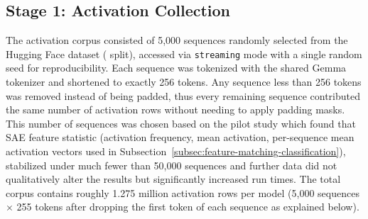 \subsection{Stage 1: Activation Collection}
\label{subsec:activation-collection}

The activation corpus consisted of 5,000 sequences randomly selected from the Hugging Face  dataset ( split), accessed via \texttt{streaming} mode with a single random seed for reproducibility. Each sequence was tokenized with the shared Gemma tokenizer and shortened to exactly 256 tokens. Any sequence less than 256 tokens was removed instead of being padded, thus every remaining sequence contributed the same number of activation rows without needing to apply padding masks. This number of sequences was chosen based on the pilot study which found that SAE feature statistic (activation frequency, mean activation, per-sequence mean activation vectors used in Subsection~\ref{subsec:feature-matching-classification}), stabilized under much fewer than 50,000 sequences and further data did not qualitatively alter the results but significantly increased run times. The total corpus contains roughly 1.275 million activation rows per model (5,000 sequences $\times$ 255 tokens after dropping the first token of each sequence as explained below).

